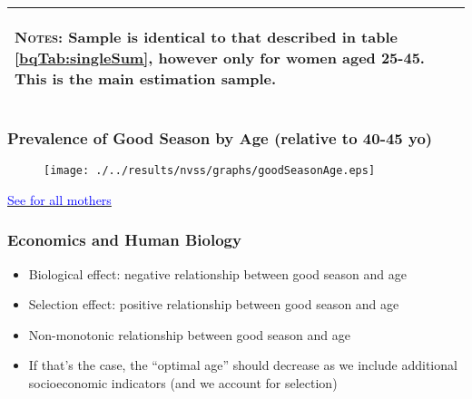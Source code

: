\documentclass[10pt,letterpaper,subeqn]{beamer}
\begin{document}
\begin{frame}
\begin{table}[htpb!]
\begin{center}
{\begin{tabular}{lccccc}
\midrule\multicolumn{6}{p{12.8cm}}{\begin{footnotesize}\textsc{Notes:} Sample is identical to that described in table \ref{bqTab:singleSum}, however only for women aged 25-45.  This  is the main estimation sample.                                    \end{footnotesize}} \\ \bottomrule
 \end{tabular}}
\end{center}\end{table}
\end{frame}




\begin{frame}[label=ages]
\frametitle{Prevalence of Good Season by Age (relative to 40-45 yo)}
\begin{figure}[htpb!]
  \centering
  \texttt{[image: ./../results/nvss/graphs/goodSeasonAge.eps]} \\
\end{figure}
\hyperlink{agesAll}{\textcolor{blue}{See for all mothers}}
\end{frame}

\begin{frame}
\frametitle{Economics and Human Biology}
\begin{itemize}
\item Biological effect: negative relationship between good season and age
\item Selection effect: positive relationship between good season and age
\item Non-monotonic relationship between good season and age
\item If that's the case, the ``optimal age'' should decrease as we include additional socioeconomic indicators (and we account for selection)
\end{itemize}
\end{frame}
\end{document}
